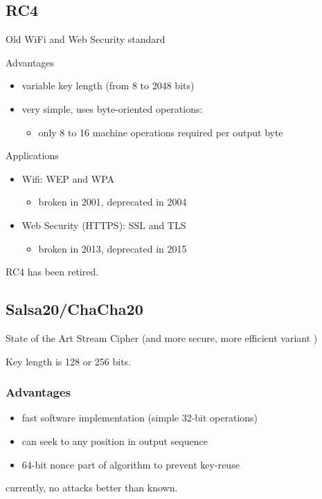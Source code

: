 \documentclass[draft]{article}
\begin{document}
\subsection{RC4}
Old WiFi and Web Security standard

Advantages
\begin{itemize}[nosep]
    \item variable key length (from 8 to 2048 bits)
    \item very simple, uses byte-oriented operations:
          \begin{itemize}[nosep]\item only 8 to 16 machine operations required per output byte\end{itemize}
\end{itemize}
Applications
\begin{itemize}[nosep]
    \item Wifi: WEP and WPA
          \begin{itemize}[nosep]\item broken in 2001, deprecated in 2004\end{itemize}
    \item Web Security (HTTPS): SSL and TLS
          \begin{itemize}[nosep]\item broken in 2013, deprecated in 2015\end{itemize}
\end{itemize}
RC4 has been retired.
\subsection{Salsa20/ChaCha20}
State of the Art Stream Cipher
 (and more secure, more efficient variant )

Key length is 128 or 256 bits.

\subsubsection*{Advantages}
\begin{itemize}[nosep]
    \item fast software implementation (simple 32-bit operations)
    \item can seek to any position in output sequence
    \item 64-bit nonce part of algorithm to prevent key-reuse
\end{itemize}
currently, no attacks better than  known.
\end{document}
